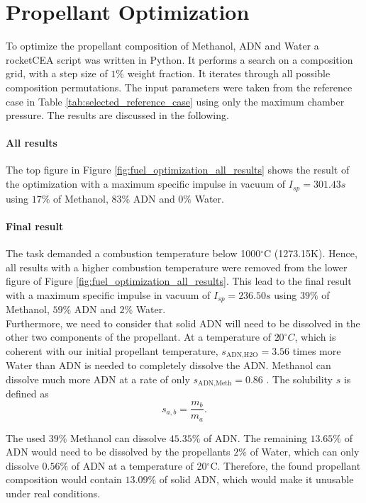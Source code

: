 \documentclass[12pt]{article}
\begin{document}
\section{Propellant Optimization}
\label{chap:task_b3}
To optimize the propellant composition of Methanol, ADN and Water a rocketCEA script was written in Python. It performs a search on a composition grid, with a step size of $1\%$ weight fraction. It iterates through all possible composition permutations. The input parameters were taken from the reference case in Table \ref{tab:selected_reference_case} using only the maximum chamber pressure. The results are discussed in the following.

\paragraph{All results}
The top figure in Figure \ref{fig:fuel_optimization_all_results} shows the result of the optimization with a maximum specific impulse in vacuum of $I_{sp}=301.43s$ using $17\%$ of Methanol, $83\%$ ADN and $0\%$ Water.

\paragraph{Final result}
The task demanded a combustion temperature below 1000$^\circ$C (1273.15K). Hence, all results with a higher combustion temperature were removed from the lower figure of Figure \ref{fig:fuel_optimization_all_results}. This lead to the final result with a maximum specific impulse in vacuum of $I_{sp}=236.50s$ using $39\%$ of Methanol, $59\%$ ADN and $2\%$ Water.\\

Furthermore, we need to consider that solid ADN will need to be dissolved in the other two components of the propellant. At a temperature of $20^\circ C$, which is coherent with our initial propellant temperature, $s_{\text{ADN,H2O}}=3.56$ times more Water than ADN is needed to completely dissolve the ADN. Methanol can dissolve much more ADN at a rate of only $s_{\text{ADN,Meth}}=0.86$ \cite{Larsson2011}. The solubility $s$ is defined as\\
\begin{equation}
	s_{a,b} = \frac{m_b}{m_a} .
\end{equation}

The used $39\%$ Methanol can dissolve $45.35\%$ of ADN. The remaining $13.65\%$ of ADN would need to be dissolved by the propellants $2\%$ of Water, which can only dissolve $0.56\%$ of ADN at a temperature of 20$^\circ$C. Therefore, the found propellant composition would contain $13.09\%$ of solid ADN, which would make it unusable under real conditions.\\
\end{document}
